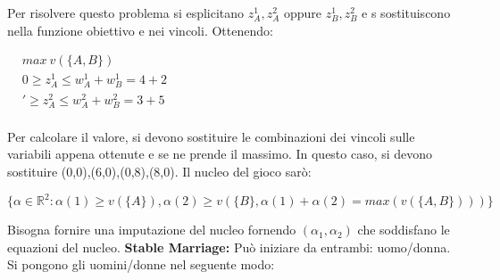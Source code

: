 \documentclass{article}
\theoremstyle{definition}
\theoremstyle{remark}
\begin{document}
Per risolvere questo problema si esplicitano \(z_A^1,z_A^2\) oppure \(z_B^1,z_B^2\) e s sostituiscono nella funzione obiettivo e nei vincoli. Ottenendo:
\begin{center}
    $\begin{aligned}
        & max\ v(\{A,B\})\\
        & 0\geq z_A^1\leq w_A^1+w_B^1=4+2\\
        & '\geq z_A^2\leq w_A^2+w_B^2=3+5\\
    \end{aligned}$
\end{center}
Per calcolare il valore, si devono sostituire le combinazioni dei vincoli sulle variabili appena ottenute e se ne prende il massimo.\newline
In questo caso, si devono sostituire (0,0),(6,0),(0,8),(8,0).\newline
Il nucleo del gioco sarò:
\begin{center}
    \(\{\alpha\in\mathbb{R}^2:\alpha(1)\geq v(\{A\}),\alpha(2)\geq v(\{B\},\alpha(1)+\alpha(2)=max(v(\{A,B\})))\}\)
\end{center}
Bisogna fornire una imputazione del nucleo fornendo \((\alpha_1,\alpha_2)\) che soddisfano le equazioni del nucleo.\newline
\textbf{Stable Marriage:} Può iniziare da entrambi: uomo/donna. Si pongono gli uomini/donne nel seguente modo:
\end{document}
